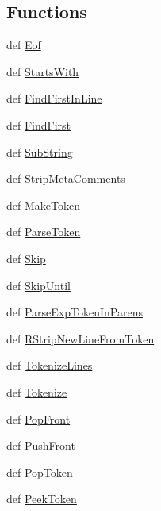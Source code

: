 \subsection*{\-Functions}
\begin{DoxyCompactItemize}
\item 
def \hyperlink{namespacepump_ace406cec139528a5aa1640edf8dbebe6}{\-Eof}
\item 
def \hyperlink{namespacepump_a291b93315bfdd697deaee88680502c00}{\-Starts\-With}
\item 
def \hyperlink{namespacepump_acca697b3cc5adc6044b115e9e16c019e}{\-Find\-First\-In\-Line}
\item 
def \hyperlink{namespacepump_a9713ad82d1c87f60ad986c6ce96f0002}{\-Find\-First}
\item 
def \hyperlink{namespacepump_a0d1ed8e160c333130bd8f84c8fe457e5}{\-Sub\-String}
\item 
def \hyperlink{namespacepump_a23b6bb138dc055b93b9d13d0b092a725}{\-Strip\-Meta\-Comments}
\item 
def \hyperlink{namespacepump_ae95150dec49136d71303f5f4239dd5b6}{\-Make\-Token}
\item 
def \hyperlink{namespacepump_a85396ae3b56877c067788f45b163eff5}{\-Parse\-Token}
\item 
def \hyperlink{namespacepump_a2a4a78c5cca4b815e2f323eba9245dd4}{\-Skip}
\item 
def \hyperlink{namespacepump_a14ce849109475f0297844fb68697f5ef}{\-Skip\-Until}
\item 
def \hyperlink{namespacepump_a44d91c490d21a9119501d099e6caf547}{\-Parse\-Exp\-Token\-In\-Parens}
\item 
def \hyperlink{namespacepump_ad52cab2935ab52c2ff26aac5196a1ace}{\-R\-Strip\-New\-Line\-From\-Token}
\item 
def \hyperlink{namespacepump_abbbf5e37a9a7dda79d6c53a99f373e27}{\-Tokenize\-Lines}
\item 
def \hyperlink{namespacepump_a20d8ba8cc8ad85c10542e430e790e3ff}{\-Tokenize}
\item 
def \hyperlink{namespacepump_abcc5a745b7c32c2f7ad56db0927e7e95}{\-Pop\-Front}
\item 
def \hyperlink{namespacepump_a2564f2b542c763cb63e04b6ebf677ab6}{\-Push\-Front}
\item 
def \hyperlink{namespacepump_a40f31f2cc2901242a70790e6076852c2}{\-Pop\-Token}
\item 
def \hyperlink{namespacepump_a31f67c63f8ebc024712e16220432b3ff}{\-Peek\-Token}
\item 

\end{DoxyCompactItemize}
